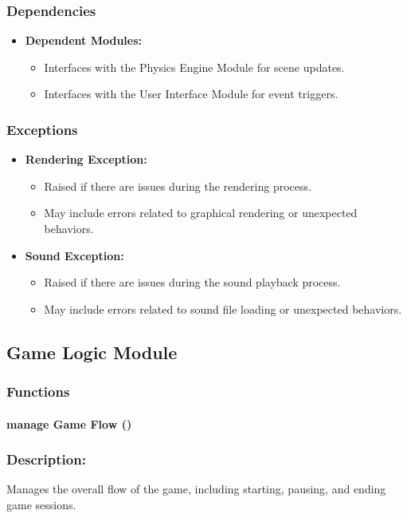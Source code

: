 \documentclass[12pt, titlepage]{article}
\begin{document}
\subsubsection{Dependencies}
\begin{itemize}
  \item \textbf{Dependent Modules:}
    \begin{itemize}
  \item Interfaces with the Physics Engine Module for scene updates.
  \item Interfaces with the User Interface Module for event triggers.
    \end{itemize}
\end{itemize}

\subsubsection{Exceptions}
\begin{itemize}
  \item \textbf{Rendering Exception:}
    \begin{itemize}
  \item Raised if there are issues during the rendering process.
  \item May include errors related to graphical rendering or unexpected behaviors.
    \end{itemize}
  \item \textbf{Sound Exception:}
    \begin{itemize}
  \item Raised if there are issues during the sound playback process.
  \item May include errors related to sound file loading or unexpected behaviors.
    \end{itemize}
\end{itemize}

\subsection{Game Logic Module}
\subsubsection{Functions}
\paragraph{manage Game Flow ()}
\subsubsection{Description:} Manages the overall flow of the game, including starting, pausing, and ending game sessions.
\end{document}
